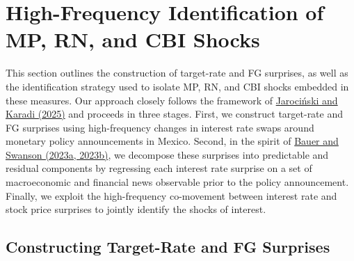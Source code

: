 \documentclass[\latexroot/\projectname]{subfiles}
\begin{document}
\whenintegrated{%
}

\section{High-Frequency Identification of MP, RN, and CBI Shocks}\whenintegrated{\label{model}}
\whenintegrated{\label{sec:model}}
\hypertarget{Section 3}{}

This section outlines the construction of target-rate and FG surprises, as well as the identification strategy used to isolate MP, RN, and CBI shocks embedded in these measures. Our approach closely follows the framework of \hyperlink{Jarociński and Karadi (2025)}{Jarociński and Karadi (2025)} and proceeds in three stages. First, we construct target-rate and FG surprises using high-frequency changes in interest rate swaps around monetary policy announcements in Mexico. Second, in the spirit of \hyperlink{Bauer and Swanson (2023a, 2023b)}{Bauer and Swanson (2023a, 2023b)}, we decompose these surprises into predictable and residual components by regressing each interest rate surprise on a set of macroeconomic and financial news observable prior to the policy announcement. Finally, we exploit the high-frequency co-movement between interest rate and stock price surprises to jointly identify the shocks of interest.



\subsection{Constructing Target-Rate and FG Surprises}
\end{document}
